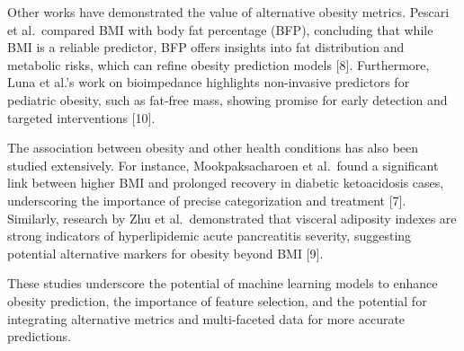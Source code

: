 Other works have demonstrated the value of alternative obesity metrics.
Pescari et al.~compared BMI with body fat percentage (BFP), concluding
that while BMI is a reliable predictor, BFP offers insights into fat
distribution and metabolic risks, which can refine obesity prediction
models {[}8{]}. Furthermore, Luna et al.'s work on bioimpedance
highlights non-invasive predictors for pediatric obesity, such as
fat-free mass, showing promise for early detection and targeted
interventions {[}10{]}.

The association between obesity and other health conditions has also
been studied extensively. For instance, Mookpaksacharoen et al.~found a
significant link between higher BMI and prolonged recovery in diabetic
ketoacidosis cases, underscoring the importance of precise
categorization and treatment {[}7{]}. Similarly, research by Zhu et
al.~demonstrated that visceral adiposity indexes are strong indicators
of hyperlipidemic acute pancreatitis severity, suggesting potential
alternative markers for obesity beyond BMI {[}9{]}.

These studies underscore the potential of machine learning models to
enhance obesity prediction, the importance of feature selection, and the
potential for integrating alternative metrics and multi-faceted data for
more accurate predictions.
